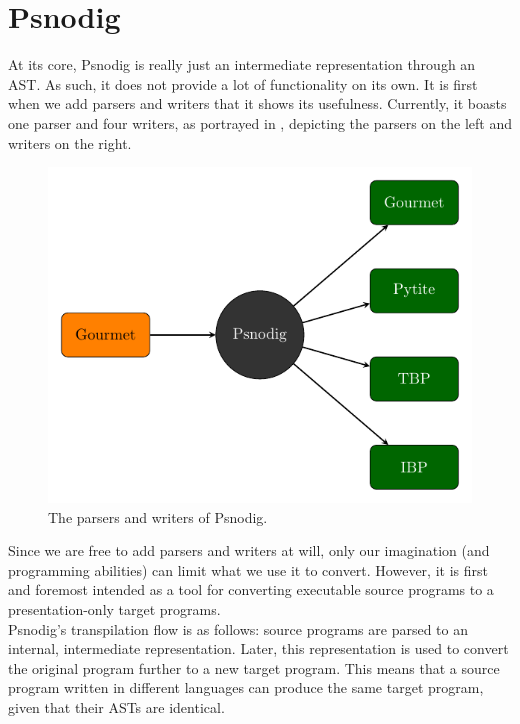 \section{Psnodig}

At its core, Psnodig is really just an intermediate representation through an AST. As such, it does not provide a lot of functionality on its own. It is first when we add parsers and writers that it shows its usefulness. Currently, it boasts one parser and four writers, as portrayed in , depicting the parsers on the left and writers on the right. \\

\begin{figure}[ht]
    \centering
    \includegraphics[scale=0.7]{assets/chapter4/Psnodig.pdf}
    \caption{The parsers and writers of Psnodig.}
    \label{The parsers and writers of Psnodig.}
\end{figure}

Since we are free to add parsers and writers at will, only our imagination (and programming abilities) can limit what we use it to convert. However, it is first and foremost intended as a tool for converting executable source programs to a presentation-only target programs. \\

Psnodig's transpilation flow is as follows: source programs are parsed to an internal, intermediate representation. Later, this representation is used to convert the original program further to a new target program. This means that a source program written in different languages can produce the same target program, given that their ASTs are identical. \\

